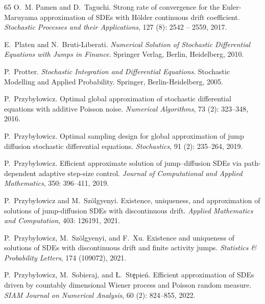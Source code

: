 \documentclass[11pt,a4paper]{article}
\numberwithin{equation}{section}
\theoremstyle{definition}
\begin{document}
{\begin{thebibliography}{65}
O.~M. Pamen and D.~Taguchi.
\newblock Strong rate of convergence for the {E}uler-{M}aruyama approximation of {SDE}s with {H}\"older continuous drift coefficient.
\newblock \emph{Stochastic Processes and their Applications}, 127 (8): 2542 -- 2559, 2017.

E.~Platen and N.~Bruti-Liberati.
\newblock \emph{Numerical {S}olution of {S}tochastic {D}ifferential {E}quations with {J}umps in {F}inance}.
\newblock Springer Verlag, Berlin, Heidelberg, 2010.

P.~Protter.
\newblock \emph{Stochastic Integration and Differential Equations}.
\newblock Stochastic Modelling and Applied Probability. Springer, Berlin-Heidelberg, 2005.

P.~Przyby{\l}owicz.
\newblock Optimal global approximation of stochastic differential equations with additive {P}oisson noise.
\newblock \emph{Numerical Algorithms}, 73 (2): 323--348, 2016.

P.~Przyby{\l}owicz.
\newblock Optimal sampling design for global approximation of jump diffusion stochastic differential equations.
\newblock \emph{Stochastics}, 91 (2): 235--264, 2019{}.

P.~Przyby{\l}owicz.
\newblock Efficient approximate solution of jump--diffusion {SDE}s via path-dependent adaptive step-size control.
\newblock \emph{Journal of Computational and Applied Mathematics}, 350: 396--411, 2019{}.

P.~Przyby{\l}owicz and M.~Sz\"olgyenyi.
\newblock Existence, uniqueness, and approximation of solutions of jump-diffusion {SDE}s with discontinuous drift.
\newblock \emph{Applied Mathematics and Computation}, 403: 126191, 2021.

P.~Przyby{\l}owicz, M.~Sz\"olgyenyi, and F.~Xu.
\newblock Existence and uniqueness of solutions of {SDE}s with discontinuous drift and finite activity jumps.
\newblock \emph{Statistics \& Probability Letters}, 174 (109072), 2021.

P.~Przyby{\l}owicz, M.~Sobieraj, and {\L}.~St\c{e}pie\'{n}.
\newblock Efficient approximation of {SDE}s driven by countably dimensional {W}iener process and {P}oisson random measure.
\newblock \emph{SIAM Journal on Numerical Analysis}, 60 (2): 824--855, 2022.


\end{thebibliography}}
\end{document}
